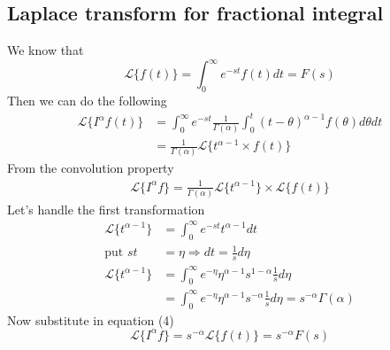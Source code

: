 \documentclass[]{article}
\begin{document}
\subsection{Laplace transform for fractional integral}
We know that
\[
    \mathcal{L} \{f(t)\} = \int_{0}^{\infty}e^{-st}f(t)dt = F(s)
\]
Then we can do the following
\begin{align*}
    \mathcal{L}\{I^{\alpha}f(t)\} & = \int_{0}^{\infty}e^{-st}\frac{1}{\Gamma(\alpha)}\int_{0}^{t}(t-\theta)^{\alpha-1}f(\theta)d\theta dt
    \\
                                  & = \frac{1}{\Gamma(\alpha)} \mathcal{L}\{t^{\alpha-1}\times f(t)\}
\end{align*}
From the convolution property
\begin{align}
    \mathcal{L}\{I^{\alpha}f\} = \frac{1}{\Gamma(\alpha)} \mathcal{L}\{t^{\alpha-1}\}\times \mathcal{L}\{f(t)\}
\end{align}
Let's handle the first transformation
\begin{align*}
    \mathcal{L}\{t^{\alpha-1}\} & = \int_{0}^{\infty}e^{-st}t^{\alpha-1}dt
    \\
    \text{put } st              & = \eta \Longrightarrow dt = \frac{1}{s}d\eta
    \\
    \mathcal{L}\{t^{\alpha-1}\} & = \int_{0}^{\infty}e^{-\eta}\eta^{\alpha-1}s^{1-\alpha}\frac{1}{s}d\eta
    \\
                                & = \int_{0}^{\infty}e^{-\eta}\eta^{\alpha-1}s^{-\alpha}\frac{1}{s}d\eta = s^{-\alpha}\Gamma(\alpha)
\end{align*}
Now substitute in equation (4)
\[
    \mathcal{L}\{I^{\alpha}f\} = s^{-\alpha}\mathcal{L}\{f(t)\} = s^{-\alpha} F(s)
\]
\end{document}
